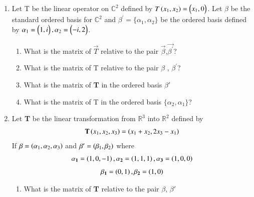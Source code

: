 \renewcommand{\theequation}{\theenumi}
\renewcommand{\thefigure}{\theenumi}
\begin{enumerate}[label=\thesubsection.\arabic*.,ref=\thesubsection.\theenumi]
%
\item Let T be the linear operator on $\mathbb{C}^{2}$ defined by $T\left(x_1 , x_2\right)=\begin{pmatrix}x_1 , 0\end{pmatrix}$.
Let $\beta$ be the standard ordered basis for $\mathbb{C}^{2}$ and $\beta^{'}=\{\alpha_1 , \alpha_2\}$
be the ordered basis defined by $\alpha_1 = \begin{pmatrix}1 , i\end{pmatrix} , \alpha_2 = \begin{pmatrix}-i , 2\end{pmatrix}$.
\begin{enumerate}
\item What is the matrix of $\vec{T}$ relative to the pair $\vec{\beta}$,$\vec{\beta^{'}}$?
%
\\
\solution

\item What is the matrix of T relative to the pair $\beta$ , $\beta^{'}$?
%
\\
\solution

\item What is the matrix of \textbf{T} in the ordered basis $\beta'$
%
\\
\solution

\item What is the matrix of T in the ordered basis $\{\alpha_2,\alpha_1\}$?
%
%
\\
\solution

\end{enumerate}
%
\item Let \textbf{T} be the linear transformation from  $\mathbb{R}^3$ into $\mathbb{R}^2$ defined by
\begin{align}
 \textbf{T} \left(x_1, x_2,x_3\right) = \left(x_1+x_2,2x_3-x_1\right)\label{T}
 \end{align}
If
 $\beta  = \left(\alpha_1,\alpha_2,\alpha_3\right) $
and $\beta' = \left(\beta_1,\beta_2\right)$
where 
\begin{align}
\mathbf{\alpha_1}  = \left(1,0,-1\right),  \mathbf{\alpha_2} = \left(1,1,1\right), \mathbf{\alpha_3} = \left(1,0,0\right)\nonumber\end{align}
\begin{align}
\mathbf{\beta_1} = \left(0,1\right), \mathbf{\beta_2} = \left(1,0\right)\nonumber
\end{align}

\begin{enumerate}
\item What is the matrix of \textbf{T} relative to the pair $\beta$, $\beta'$
%
\\
\solution

\end{enumerate}


\end{enumerate}
